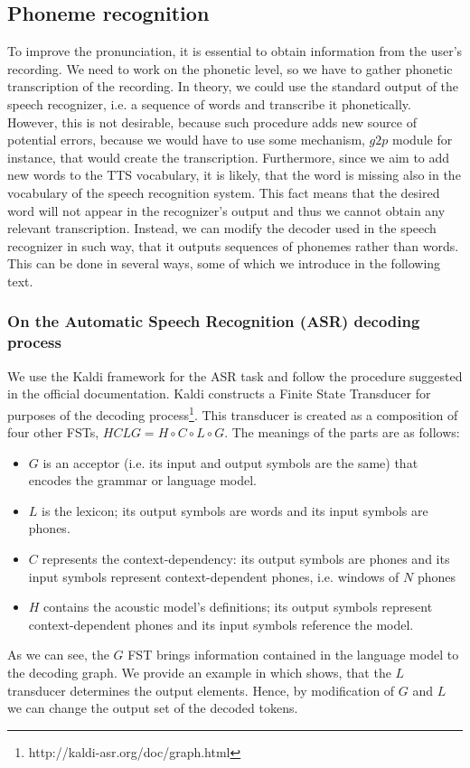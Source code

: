 \subsection{Phoneme recognition}
To improve the pronunciation, it is essential to obtain information from the user's recording.
We need to work on the phonetic level, so we have to gather phonetic transcription of the recording.
In theory, we could use the standard output of the speech recognizer, i.e. a sequence of words and transcribe it phonetically.
However, this is not desirable, because such procedure adds new source of potential errors, because we would have to use some mechanism, $g2p$ module for instance, that would create the transcription.
Furthermore, since we aim to add new words to the TTS vocabulary, it is likely, that the word is missing also in the vocabulary of the speech recognition system.
This fact means that the desired word will not appear in the recognizer's output and thus we cannot obtain any relevant transcription.
Instead, we can modify the decoder used in the speech recognizer in such way, that it outputs sequences of phonemes rather than words.
This can be done in several ways, some of which we introduce in the following text.
\subsubsection{On the Automatic Speech Recognition (ASR) decoding process}
We use the Kaldi framework for the ASR task and follow the procedure suggested in the official documentation.
Kaldi constructs a Finite State Transducer for purposes of the decoding process\footnote{http://kaldi-asr.org/doc/graph.html}.
This transducer is created as a composition of four other FSTs, $HCLG = H \circ C \circ L \circ G$.
The meanings of the parts are as follows:
\begin{itemize}
\item $G$ is an acceptor (i.e. its input and output symbols are the same) that encodes the grammar or language model.
\item $L$ is the lexicon; its output symbols are words and its input symbols are phones.
\item $C$ represents the context-dependency: its output symbols are phones and its input symbols represent context-dependent phones, i.e. windows of $N$ phones
\item $H$ contains the acoustic model's definitions; its output symbols represent context-dependent phones and its input symbols reference the model.
\end{itemize}
As we can see, the $G$ FST brings information contained in the language model to the decoding graph.
We provide an example in  which shows, that the $L$ transducer determines the output elements.
Hence, by modification of $G$ and $L$ we can change the output set of the decoded tokens.
